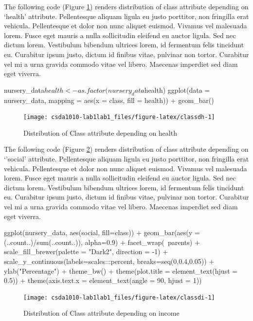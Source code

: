 The following code (Figure \ref{fig:classdh}) renders distribution of
class attribute depending on `health' attribute. Pellentesque aliquam
ligula eu justo porttitor, non fringilla erat vehicula. Pellentesque et
dolor non nunc aliquet euismod. Vivamus vel malesuada lorem. Fusce eget
mauris a nulla sollicitudin eleifend eu auctor ligula. Sed nec dictum
lorem. Vestibulum bibendum ultrices lorem, id fermentum felis tincidunt
eu. Curabitur ipsum justo, dictum id finibus vitae, pulvinar non tortor.
Curabitur vel mi a urna gravida commodo vitae vel libero. Maecenas
imperdiet sed diam eget viverra.

\begin{Schunk}
\begin{Sinput}
nursery_data$health <- as.factor(nursery_data$health)
ggplot(data = nursery_data, mapping = aes(x = class, fill = health)) +
  geom_bar()
\end{Sinput}
\begin{figure}

{\centering \texttt{[image: csda1010-lab1lab1\_files/figure-latex/classdh-1]} 

}

\caption[Distribution of Class attribute depending on health]{Distribution of Class attribute depending on health}\label{fig:classdh}
\end{figure}
\end{Schunk}

The following code (Figure \ref{fig:classdi}) renders distribution of
class attribute depending on `'social' attribute. Pellentesque aliquam
ligula eu justo porttitor, non fringilla erat vehicula. Pellentesque et
dolor non nunc aliquet euismod. Vivamus vel malesuada lorem. Fusce eget
mauris a nulla sollicitudin eleifend eu auctor ligula. Sed nec dictum
lorem. Vestibulum bibendum ultrices lorem, id fermentum felis tincidunt
eu. Curabitur ipsum justo, dictum id finibus vitae, pulvinar non tortor.
Curabitur vel mi a urna gravida commodo vitae vel libero. Maecenas
imperdiet sed diam eget viverra.

\begin{Schunk}
\begin{Sinput}
ggplot(nursery_data, aes(social, fill=class)) + 
  geom_bar(aes(y = (..count..)/sum(..count..)), alpha=0.9) +
  facet_wrap(~parents) + 
  scale_fill_brewer(palette = "Dark2", direction = -1) +
  scale_y_continuous(labels=scales:::percent, breaks=seq(0,0.4,0.05)) +
  ylab("Percentage") +
  theme_bw() +
  theme(plot.title = element_text(hjust = 0.5)) +
  theme(axis.text.x = element_text(angle = 90, hjust = 1))
\end{Sinput}
\begin{figure}

{\centering \texttt{[image: csda1010-lab1lab1\_files/figure-latex/classdi-1]} 

}

\caption[Distribution of Class attribute depending on income]{Distribution of Class attribute depending on income}\label{fig:classdi}
\end{figure}
\end{Schunk}

